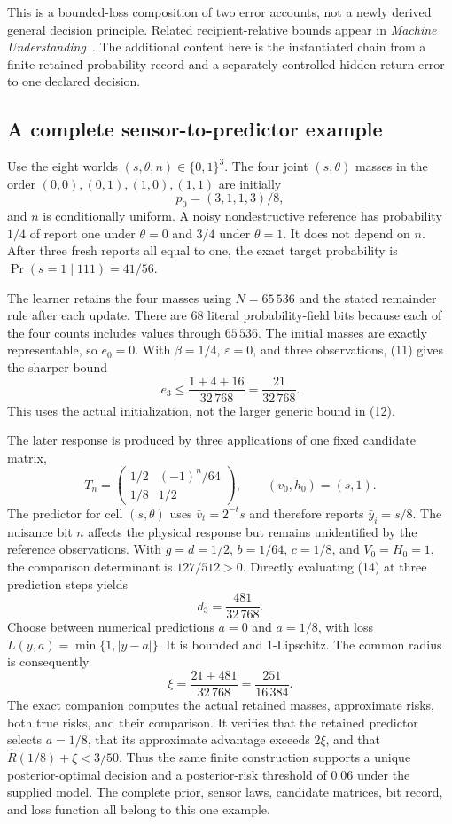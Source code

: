 This is a bounded-loss composition of two error accounts, not a newly derived general decision principle. Related recipient-relative bounds appear in \emph{Machine Understanding}~\cite{GA:understanding}. The additional content here is the instantiated chain from a finite retained probability record and a separately controlled hidden-return error to one declared decision.

\subsection{A complete sensor-to-predictor example}
Use the eight worlds $(s,\theta,n)\in\{0,1\}^3$. The four joint $(s,\theta)$ masses in the order $(0,0),(0,1),(1,0),(1,1)$ are initially
\[
 p_0=(3,1,1,3)/8,
\]
and $n$ is conditionally uniform. A noisy nondestructive reference has probability $1/4$ of report one under $\theta=0$ and $3/4$ under $\theta=1$. It does not depend on $n$. After three fresh reports all equal to one, the exact target probability is $\Pr(s=1\mid111)=41/56$.

The learner retains the four masses using $N=65\,536$ and the stated remainder rule after each update. There are 68 literal probability-field bits because each of the four counts includes values through $65\,536$. The initial masses are exactly representable, so $e_0=0$. With $\beta=1/4$, $\varepsilon=0$, and three observations, (11) gives the sharper bound
\[
 e_3\le\frac{1+4+16}{32\,768}=\frac{21}{32\,768}.
\]
This uses the actual initialization, not the larger generic bound in (12).

The later response is produced by three applications of one fixed candidate matrix,
\[
 T_n=\begin{pmatrix}1/2&(-1)^n/64\\1/8&1/2\end{pmatrix},
 \qquad (v_0,h_0)=(s,1).
\tag{17}
\]
The predictor for cell $(s,\theta)$ uses $\bar v_t=2^{-t}s$ and therefore reports $\bar y_i=s/8$. The nuisance bit $n$ affects the physical response but remains unidentified by the reference observations. With $g=d=1/2$, $b=1/64$, $c=1/8$, and $V_0=H_0=1$, the comparison determinant is $127/512>0$. Directly evaluating (14) at three prediction steps yields
\[
 d_3=\frac{481}{32\,768}.
\]
Choose between numerical predictions $a=0$ and $a=1/8$, with loss $L(y,a)=\min\{1,|y-a|\}$. It is bounded and 1-Lipschitz. The common radius is consequently
\[
 \xi=\frac{21+481}{32\,768}=\frac{251}{16\,384}.
\]
The exact companion computes the actual retained masses, approximate risks, both true risks, and their comparison. It verifies that the retained predictor selects $a=1/8$, that its approximate advantage exceeds $2\xi$, and that $\widehat R(1/8)+\xi<3/50$. Thus the same finite construction supports a unique posterior-optimal decision and a posterior-risk threshold of $0.06$ under the supplied model. The complete prior, sensor laws, candidate matrices, bit record, and loss function all belong to this one example.

